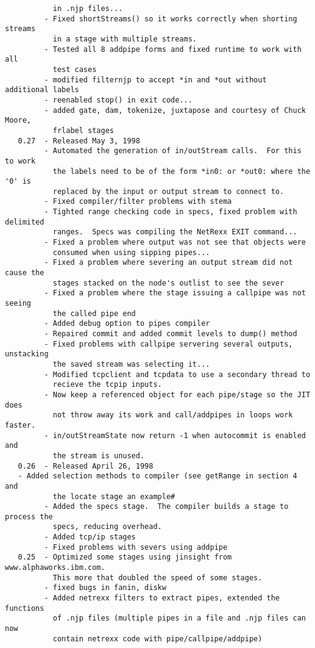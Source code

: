 \begin{verbatim}
           in .njp files...
         - Fixed shortStreams() so it works correctly when shorting streams
           in a stage with multiple streams.
         - Tested all 8 addpipe forms and fixed runtime to work with all
           test cases
         - modified filternjp to accept *in and *out without additional labels
         - reenabled stop() in exit code...
         - added gate, dam, tokenize, juxtapose and courtesy of Chuck Moore,
           frlabel stages
   0.27  - Released May 3, 1998
         - Automated the generation of in/outStream calls.  For this to work
           the labels need to be of the form *in0: or *out0: where the '0' is
           replaced by the input or output stream to connect to.
         - Fixed compiler/filter problems with stema
         - Tighted range checking code in specs, fixed problem with delimited
           ranges.  Specs was compiling the NetRexx EXIT command...
         - Fixed a problem where output was not see that objects were
           consumed when using sipping pipes...
         - Fixed a problem where severing an output stream did not cause the
           stages stacked on the node's outlist to see the sever
         - Fixed a problem where the stage issuing a callpipe was not seeing
           the called pipe end
         - Added debug option to pipes compiler
         - Repaired commit and added commit levels to dump() method
         - Fixed problems with callpipe servering several outputs, unstacking
           the saved stream was selecting it...
         - Modified tcpclient and tcpdata to use a secondary thread to
           recieve the tcpip inputs.
         - Now keep a referenced object for each pipe/stage so the JIT does
           not throw away its work and call/addpipes in loops work faster.
         - in/outStreamState now return -1 when autocommit is enabled and
           the stream is unused.
   0.26  - Released April 26, 1998
   - Added selection methods to compiler (see getRange in section 4 and
           the locate stage an example#
         - Added the specs stage.  The compiler builds a stage to process the
           specs, reducing overhead.
         - Added tcp/ip stages
         - Fixed problems with severs using addpipe
   0.25  - Optimized some stages using jinsight from www.alphaworks.ibm.com.
           This more that doubled the speed of some stages.
         - fixed bugs in fanin, diskw
         - Added netrexx filters to extract pipes, extended the functions
           of .njp files (multiple pipes in a file and .njp files can now
           contain netrexx code with pipe/callpipe/addpipe)

\end{verbatim}
